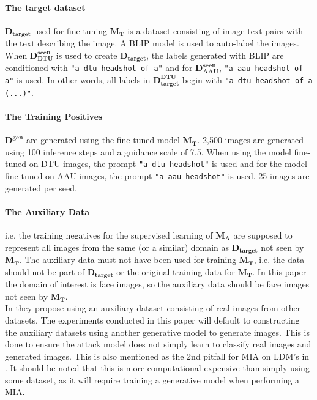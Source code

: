 \paragraph{The target dataset}
 $\mathbf{D_{target}}$ used for fine-tuning $\mathbf{M_T}$ is a dataset consisting of image-text pairs with the text describing the image. A BLIP model \cite{blip}  is used to auto-label the images. When $\mathbf{D_{DTU}^{seen}}$ is used to create $\mathbf{D_{target}}$, the labels generated with BLIP are conditioned with \texttt{"a dtu headshot of a"} and for $\mathbf{D_{AAU}^{seen}}$, \texttt{"a aau headshot of a"} is used. In other words, all labels in $\mathbf{D_{target}^{DTU}}$ begin with \texttt{"a dtu headshot of a (...)"}.
 
\paragraph{The Training Positives} 
$\mathbf{D^{gen}}$ are generated using the fine-tuned model $\mathbf{M_T}$. 2,500 images are generated using 100 inference steps and a guidance scale of 7.5.  When using the model fine-tuned on DTU images, the prompt \texttt{"a dtu headshot"} is used and for the model fine-tuned on AAU images, the prompt \texttt{"a aau headshot"} is used. 25 images are generated per seed.

\paragraph{The Auxiliary Data}
i.e. the training negatives for the supervised learning of $\mathbf{M_A}$ are supposed to represent all images from the same (or a similar) domain as $\mathbf{D_{target}}$ not seen by $\mathbf{M_T}$. The auxiliary data must not have been used for training $\mathbf{M_T}$, i.e. the data should not be part of $\mathbf{D_{target}}$ or the original training data for $\mathbf{M_T}$. In this paper the domain of interest is face images, so the auxiliary data should be face images not seen by $\mathbf{M_T}$.\\
 In \cite{zhang2023generated} they propose using an auxiliary dataset consisting of real images from other datasets. The experiments conducted in this paper will default to constructing the auxiliary datasets using another generative model to generate images. This is done to ensure the attack model does not simply learn to classify real images and generated images. This is also mentioned as the 2nd pitfall for MIA on LDM's in \cite{Dubinski2023TowardsMR}. It should be noted that this is more computational expensive than simply using some dataset, as it will require training a generative model when performing a MIA. 

